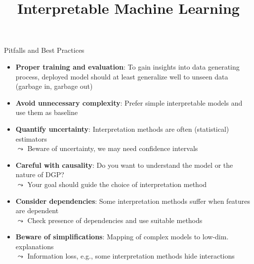 \documentclass[11pt,compress,t,notes=noshow, aspectratio=169, xcolor=table]{beamer}
\title{Interpretable Machine Learning}
\date{}
\begin{document}
\newcommand{\titlefigure}{figure/open_blackbox}
\newcommand{\learninggoals}{
\item General pitfalls of interpretation methods}

%
%

\begin{frame}[t]{Pitfalls and Best Practices~}

\begin{itemize}[<+->]
    \item \textbf{Proper training and evaluation}:
    To gain insights into data generating process, deployed model should at least generalize well to unseen data (garbage in, garbage out)
    \item \textbf{Avoid unnecessary complexity}: Prefer simple interpretable models and use them as baseline
    \item \textbf{Quantify uncertainty}: Interpretation methods are often (statistical) estimators \\
    $\leadsto$ Beware of uncertainty, we may need confidence intervals
    \item \textbf{Careful with causality}:
     Do you want to understand the model or the nature of DGP?\\
     $\leadsto$ Your goal should guide the choice of interpretation method
    \item \textbf{Consider dependencies}: Some interpretation methods suffer when features are dependent\\
    $\leadsto$ Check presence of dependencies and use suitable methods
    \item \textbf{Beware of simplifications}:
    Mapping of complex models to low-dim. explanations\\
    $\leadsto$ Information loss, e.g., some interpretation methods hide interactions
\end{itemize}

\end{frame}

\endlecture
\end{document}
